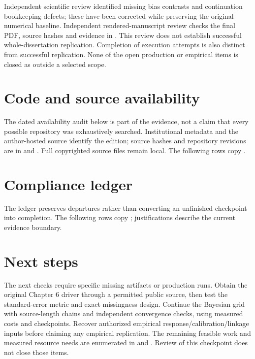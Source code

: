 Independent scientific review identified missing bias contrasts and continuation bookkeeping defects; these have been corrected while preserving the original numerical baseline. Independent rendered-manuscript review checks the final PDF, source hashes and evidence in . This review does not establish successful whole-dissertation replication. Completion of execution attempts is also distinct from successful replication. None of the open production or empirical items is closed as outside a selected scope.

\section{Code and source availability}
The dated availability audit below is part of the evidence, not a claim that every possible repository was exhaustively searched. Institutional metadata and the author-hosted source identify the edition; source hashes and repository revisions are in  and . Full copyrighted source files remain local. The following rows copy .
{\small}

\section{Compliance ledger}
The ledger preserves departures rather than converting an unfinished checkpoint into completion. The following rows copy ; justifications describe the current evidence boundary.
{\small}

\section{Next steps}
The next checks require specific missing artifacts or production runs. Obtain the original Chapter 6 driver through a permitted public source, then test the standard-error metric and exact missingness design. Continue the Bayesian grid with source-length chains and independent convergence checks, using measured costs and checkpoints. Recover authorized empirical response/calibration/linkage inputs before claiming any empirical replication. The remaining feasible work and measured resource needs are enumerated in  and . Review of this checkpoint does not close those items.

